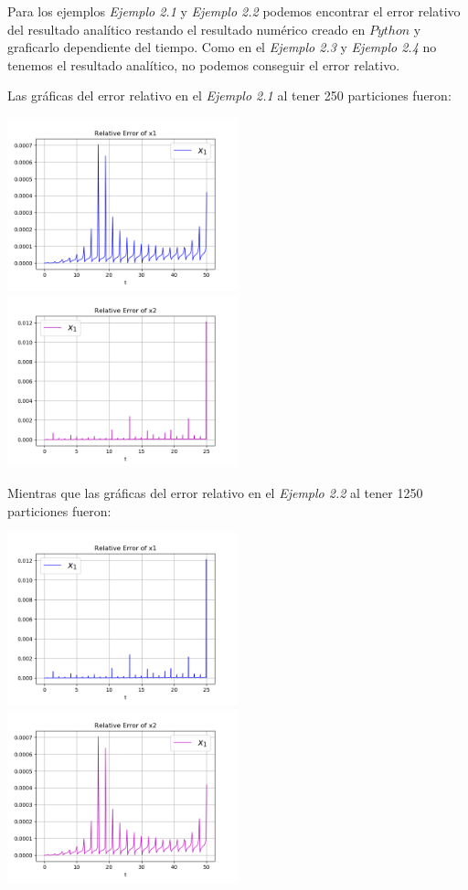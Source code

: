 \documentclass{article}
\begin{document}
Para los ejemplos \textit{Ejemplo 2.1} y \textit{Ejemplo 2.2} podemos encontrar el error relativo del resultado analítico restando el resultado numérico creado en $Python$ y graficarlo dependiente del tiempo. Como en  el \textit{Ejemplo 2.3} y \textit{Ejemplo 2.4} no tenemos el resultado analítico, no podemos conseguir el error relativo.

Las gráficas del error relativo en el \textit{Ejemplo 2.1} al tener 250 particiones fueron:

\begin{center}
\includegraphics[height=5cm]{error2_1_pt1.png}
\includegraphics[height=5cm]{error2_2_pt2.png}
\end{center}

Mientras que las gráficas del error relativo en el \textit{Ejemplo 2.2} al tener 1250 particiones fueron:

\begin{center}
\includegraphics[height=5cm]{error2_2_pt1.png}
\includegraphics[height=5cm]{error2_1_pt2.png}
\end{center}
\end{document}
